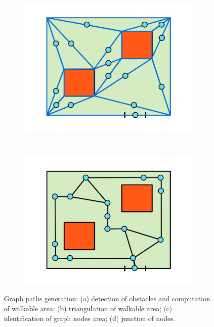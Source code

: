 \documentclass{sig-alternate}
\begin{document}
\begin{figure}
        ~
        \begin{subfigure}[b]{0.235\textwidth}
                \includegraphics[width=\textwidth]{images/graph-generation/single/graph-generation-3}
                \caption{}
                \label{fig:graph-generation-c}
        \end{subfigure}
        ~
        \begin{subfigure}[b]{0.235\textwidth}
                \includegraphics[width=\textwidth]{images/graph-generation/single/graph-generation-4}
                \caption{}
                \label{fig:graph-generation-d}
        \end{subfigure}
        
        \caption{Graph paths generation: (a) detection of obstacles and computation of walkable area; (b) triangulation of walkable area; (c) identification of graph nodes area; (d) junction of nodes.}
        \label{fig:graph-generation}
\end{figure}
\end{document}
